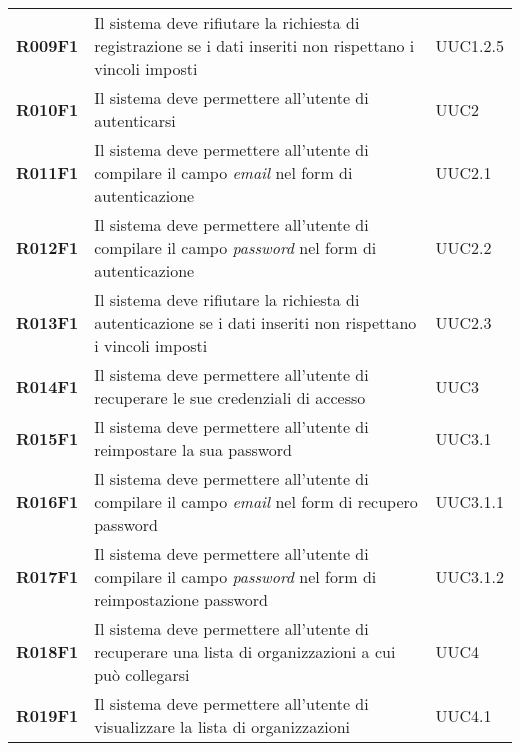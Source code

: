 \documentclass[../analisi-dei-requisiti.tex]{subfiles}
\begin{document}
\begin{longtable}[H]{>{\centering\bfseries}m{3cm} >{\centering}m{10cm} >{\centering\arraybackslash}m{3cm}}
  R009F1                  & Il sistema deve rifiutare la richiesta di registrazione se i dati inseriti non rispettano i vincoli imposti                                    & UUC1.2.5                      \\
  R010F1                  & Il sistema deve permettere all'utente di autenticarsi                                                                                          & UUC2                          \\
  R011F1                  & Il sistema deve permettere all'utente di compilare il campo \textit{email} nel form di autenticazione                                          & UUC2.1                        \\
  R012F1                  & Il sistema deve permettere all'utente di compilare il campo \textit{password} nel form di autenticazione                                       & UUC2.2                        \\
  R013F1                  & Il sistema deve rifiutare la richiesta di autenticazione se i dati inseriti non rispettano i vincoli imposti                                   & UUC2.3                        \\
  R014F1                  & Il sistema deve permettere all'utente di recuperare le sue credenziali di accesso                                                              & UUC3                          \\
  R015F1                  & Il sistema deve permettere all'utente di reimpostare la sua password                                                                           & UUC3.1                        \\
  R016F1                  & Il sistema deve permettere all'utente di compilare il campo \textit{email} nel form di recupero password                                       & UUC3.1.1                      \\
  R017F1                  & Il sistema deve permettere all'utente di compilare il campo \textit{password} nel form di reimpostazione password                              & UUC3.1.2                      \\
  R018F1                  & Il sistema deve permettere all'utente di recuperare una lista di organizzazioni a cui può collegarsi                                           & UUC4                          \\
  R019F1                  & Il sistema deve permettere all'utente di visualizzare la lista di organizzazioni                                                               & UUC4.1                        \\

\end{longtable}
\end{document}
